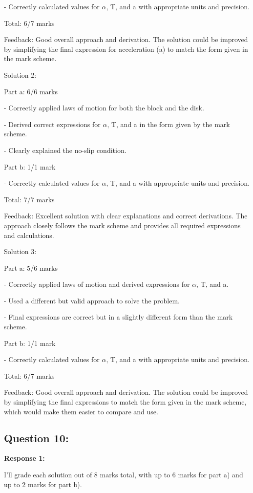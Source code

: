 \documentclass[a4paper,11pt]{article}
\begin{document}
- Correctly calculated values for \(\alpha\), T, and a with appropriate units and precision.

Total: 6/7 marks

Feedback: Good overall approach and derivation. The solution could be improved by simplifying the final expression for acceleration (a) to match the form given in the mark scheme.

Solution 2:

Part a: 6/6 marks

- Correctly applied laws of motion for both the block and the disk.

- Derived correct expressions for \(\alpha\), T, and a in the form given by the mark scheme.

- Clearly explained the no-slip condition.

Part b: 1/1 mark

- Correctly calculated values for \(\alpha\), T, and a with appropriate units and precision.

Total: 7/7 marks

Feedback: Excellent solution with clear explanations and correct derivations. The approach closely follows the mark scheme and provides all required expressions and calculations.

Solution 3:

Part a: 5/6 marks

- Correctly applied laws of motion and derived expressions for \(\alpha\), T, and a.

- Used a different but valid approach to solve the problem.

- Final expressions are correct but in a slightly different form than the mark scheme.

Part b: 1/1 mark

- Correctly calculated values for \(\alpha\), T, and a with appropriate units and precision.

Total: 6/7 marks

Feedback: Good overall approach and derivation. The solution could be improved by simplifying the final expressions to match the form given in the mark scheme, which would make them easier to compare and use.

\subsection*{Question 10:}

\textbf{Response 1:}

I'll grade each solution out of 8 marks total, with up to 6 marks for part a) and up to 2 marks for part b).
\end{document}

